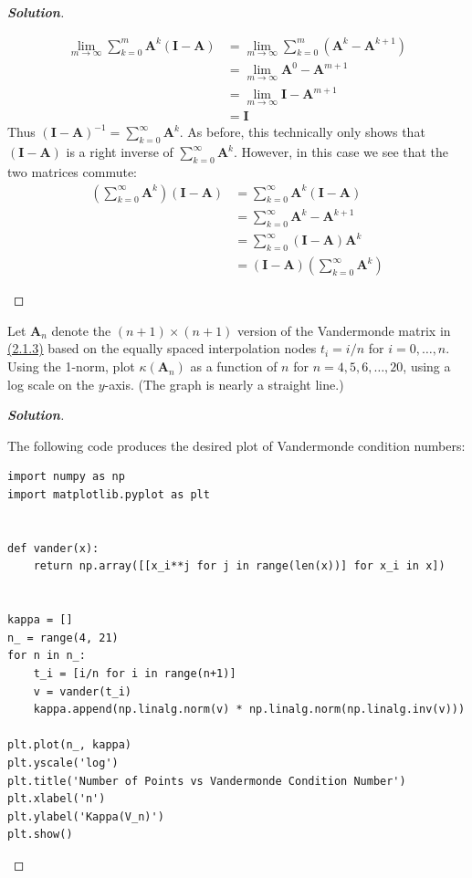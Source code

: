 \documentclass[11pt]{article}
\renewcommand{\vec}[1]{\mathbf{#1}}
\newenvironment{problem}[2][Question]{\begin{trivlist}
\item[\hskip \labelsep {\bfseries #1}\hskip \labelsep {\bfseries #2.}]}{\end{trivlist}}
\newenvironment{solution}{%
  \begin{proof}[\textbf{Solution}]$ $\par\nobreak\ignorespaces
}{%
  \end{proof}
}
\theoremstyle{definition}
\begin{document}
\begin{solution}
\begin{enumerate}[(a)]
\begin{align*}
        \lim_{m \rightarrow \infty} \sum_{k = 0}^{m} \vec{A}^k(\vec{I} - \vec{A}) &= \lim_{m \rightarrow \infty} \sum_{k = 0}^{m} (\vec{A}^k - \vec{A}^{k+1}) \\
        &= \lim_{m \rightarrow \infty} \vec{A}^0 - \vec{A}^{m+1} \\
        &= \lim_{m \rightarrow \infty} \vec{I} - \vec{A}^{m+1} \\
        &= \vec{I}
    \end{align*}
    Thus $(\vec{I} - \vec{A})^{-1} = \sum_{k = 0}^{\infty} \vec{A}^k$.
    As before, this technically only shows that $(\vec{I} - \vec{A})$ is a right inverse of $\sum_{k = 0}^{\infty} \vec{A}^k$. However, in this case we see that the two matrices commute:
    \begin{align*}
        \left(\sum_{k = 0}^{\infty} \vec{A}^k\right)(\vec{I} - \vec{A}) &= \sum_{k = 0}^{\infty} \vec{A}^k(\vec{I} - \vec{A}) \\
        &= \sum_{k = 0}^{\infty} \vec{A}^k - \vec{A}^{k+1} \\
        &= \sum_{k = 0}^{\infty} (\vec{I} - \vec{A})\vec{A}^k \\
        &= (\vec{I} - \vec{A})\left(\sum_{k = 0}^{\infty} \vec{A}^k\right)
    \end{align*}
\end{enumerate}
\end{solution}



\begin{problem}{2.8.4}
Let $\vec{A}_n$ denote the $(n+1) \times (n+1)$ version of the Vandermonde matrix in \href{https://fncbook.com/polyinterp#vandersystem}{(2.1.3)} based on the equally spaced interpolation nodes $t_i = i/n$ for $i = 0, \ldots, n$. Using the 1-norm, plot $\kappa(\vec{A}_n)$ as a function of $n$ for $n = 4, 5, 6, \ldots, 20$, using a log scale on the $y$-axis. (The graph is nearly a straight line.)
\end{problem}
\begin{solution}
The following code produces the desired plot of Vandermonde condition numbers:
\begin{lstlisting}[frame=tlrb]
import numpy as np
import matplotlib.pyplot as plt


def vander(x):
    return np.array([[x_i**j for j in range(len(x))] for x_i in x])


kappa = []
n_ = range(4, 21)
for n in n_:
    t_i = [i/n for i in range(n+1)]
    v = vander(t_i)
    kappa.append(np.linalg.norm(v) * np.linalg.norm(np.linalg.inv(v)))

plt.plot(n_, kappa)
plt.yscale('log')
plt.title('Number of Points vs Vandermonde Condition Number')
plt.xlabel('n')
plt.ylabel('Kappa(V_n)')
plt.show()
\end{lstlisting}
\end{solution}
\end{document}
